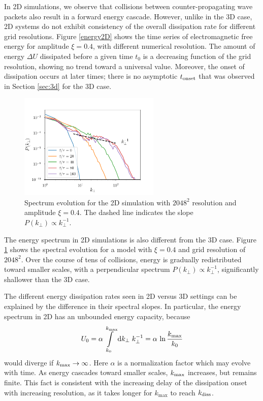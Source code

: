 In 2D simulations, we observe that collisions between counter-propagating wave packets also result in a forward energy cascade.
However, unlike in the 3D case, 2D systems do not exhibit consistency of the overall dissipation rate for different grid resolutions. 
Figure \ref{energy2D} shows the time series of electromagnetic free energy for amplitude $\xi = 0.4$, with different numerical resolution.
The amount of energy $\Delta U$ dissipated before a given time $t_0$ is a decreasing function of the grid resolution, showing no trend toward a universal value.
Moreover, the onset of dissipation occurs at later times; there is no asymptotic $t_{\rm onset}$ that was observed in Section \ref{sec:3d} for the 3D case.
%
\begin{figure}[h]
\centering
\includegraphics[width=0.6\textwidth]{pics/chap4/spec2Dev}
\caption[Spectrum evolution for the 2D simulation]{Spectrum evolution for the 2D simulation with $2048^2$ resolution and amplitude $\xi =0.4$. The dashed line indicates the slope $P(k_\perp)\propto k_\perp^{-1}$.}
\label{spec2Dev}
\end{figure}
%

The energy spectrum in 2D simulations is also different from the 3D case. Figure \ref{spec2Dev} shows the spectral evolution for a model with $\xi = 0.4$ and grid resolution of $2048^2$. Over the course of tens of collisions, energy is gradually redistributed toward smaller scales, with a perpendicular spectrum $P(k_\perp) \propto k_\perp^{-1}$, significantly shallower than the 3D case.

The different energy dissipation rates seen in 2D versus 3D settings can be explained by the difference in their spectral slopes.
In particular, the energy spectrum in 2D has an unbounded energy capacity, because
%
\begin{equation}\label{eqn:energy-cap}
	U_0 = \alpha \int\limits_{k_{0}} ^{k_{\rm max}} \mathrm{d} k_{\perp} \; k_\perp^{-1} = \alpha 
    \,\ln
    \frac{k_{\rm max}}{k_0}
\end{equation}
%
would diverge if $k_{\rm max}\rightarrow \infty$. Here $\alpha$ is a normalization factor which may evolve with time. As energy cascades toward smaller scales, $k_{\rm max}$ increases, but remains finite. This fact is consistent with the increasing delay of the dissipation onset with increasing resolution, as it takes longer for $k_{\max}$ to reach $k_{\rm diss}$.

